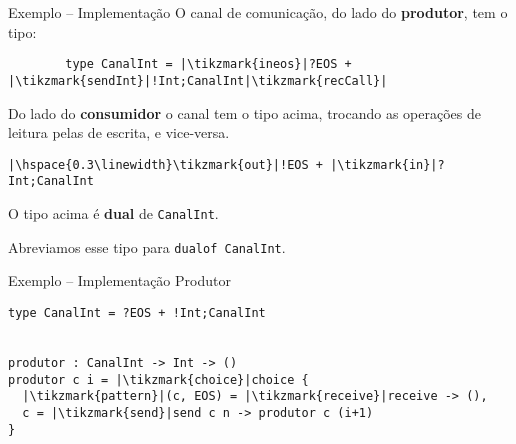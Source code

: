 \begin{frame}[fragile]{Exemplo -- Implementação}
  O canal de comunicação, do lado do \textbf{produtor}, tem o tipo:
  \vspace*{4mm}
  \begin{lstlisting}
        type CanalInt = |\tikzmark{ineos}|?EOS + |\tikzmark{sendInt}|!Int;CanalInt|\tikzmark{recCall}|
\end{lstlisting} 
 
 

 Do lado do \textbf{consumidor} o canal tem o tipo acima, trocando as operações de leitura pelas de escrita, e vice-versa.
\vspace*{4mm} 
\begin{lstlisting}
|\hspace{0.3\linewidth}\tikzmark{out}|!EOS + |\tikzmark{in}|?Int;CanalInt
\end{lstlisting}


\centering
\begin{tcolorbox}
  O tipo acima é \textbf{dual} de \lstinline|CanalInt|.

  Abreviamos esse tipo para \lstinline|dualof CanalInt|.
\end{tcolorbox}

\end{frame}

\begin{frame}[fragile]{Exemplo -- Implementação  \hfill \color{mLightBrown}Produtor}
  \begin{lstlisting}[xleftmargin=.15\textwidth, xrightmargin=.15\textwidth]
type CanalInt = ?EOS + !Int;CanalInt

    
produtor : CanalInt -> Int -> ()
produtor c i = |\tikzmark{choice}|choice {
  |\tikzmark{pattern}|(c, EOS) = |\tikzmark{receive}|receive -> (),
  c = |\tikzmark{send}|send c n -> produtor c (i+1)
}
  \end{lstlisting}


  
\end{frame}


